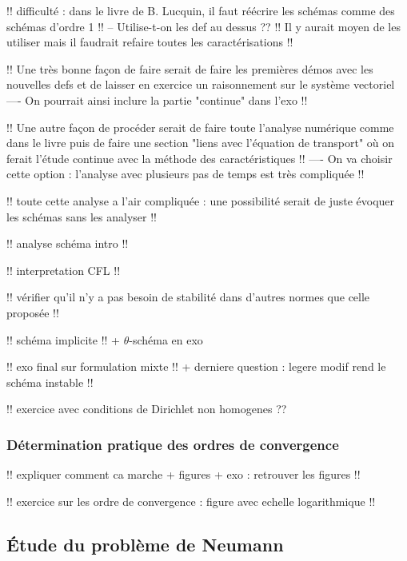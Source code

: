 \documentclass[12pt,a4paper,twoside]{article}
\begin{document}
!! difficult\'e : dans le livre de B. Lucquin, il faut r\'e\'ecrire les 
sch\'emas comme des sch\'emas d'ordre 1 !!
-- Utilise-t-on les def au dessus ??
!! Il y aurait moyen de les utiliser mais il faudrait refaire toutes les 
caract\'erisations !!

!! Une tr\`es bonne fa\c{c}on de faire serait de faire les premi\`eres d\'emos avec
les nouvelles defs et de laisser en exercice un raisonnement sur le syst\`eme vectoriel
---- On pourrait ainsi inclure la partie "continue" dans l'exo !!


!! Une autre fa\c{c}on de proc\'eder serait de faire toute l'analyse num\'erique comme dans
le livre puis de faire une section "liens avec l'\'equation de transport"
o\`u on ferait l'\'etude continue avec la m\'ethode des caract\'eristiques !!
---- On va choisir cette option : l'analyse avec plusieurs pas de temps est tr\`es compliqu\'ee !!



!! toute cette analyse a l'air compliqu\'ee : une possibilit\'e serait 
de juste \'evoquer les sch\'emas sans les analyser !!

!! analyse sch\'ema intro !!

!! interpretation CFL !!

!! v\'erifier qu'il n'y a pas besoin de stabilit\'e dans d'autres normes
que celle propos\'ee !!


!! sch\'ema implicite !!
+ $\theta$-sch\'ema en exo


!! exo final sur formulation mixte !!
+ derniere question : legere modif rend le sch\'ema instable !!

!! exercice avec conditions de Dirichlet non homogenes ??




\subsubsection{D\'etermination pratique des ordres de convergence}


!! expliquer comment ca marche + figures + exo : retrouver les figures !!


!! exercice sur les ordre de convergence : figure avec echelle logarithmique !!



\subsection{\'Etude du probl\`eme de Neumann}
\end{document}

